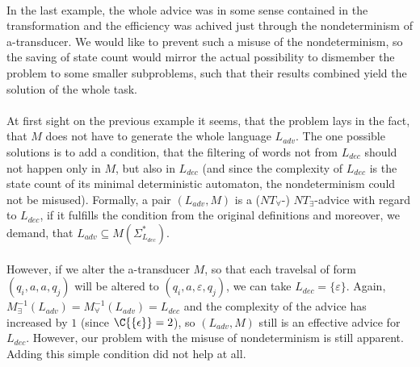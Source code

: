 \paragraph{}
In the last example, the whole advice was in some sense contained in the transformation and the efficiency was achived just through the nondeterminism of a-transducer. We would like to prevent such a misuse of the nondeterminism, so the saving of state count would mirror the actual possibility to dismember the problem to some smaller subproblems, such that their results combined yield the solution of the whole task.

\paragraph{}
At first sight on the previous example it seems, that the problem lays in the fact, that $M$ does not have to generate the whole language $L_{adv}$. The one possible solutions is to add a condition, that the filtering of words not from $L_{dec}$ should not happen only in $M$, but also in $L_{dec}$ (and since the complexity of $L_{dec}$ is the state count of its minimal deterministic automaton, the nondeterminism could not be misused). Formally, a pair $(L_{adv}, M)$ is a ($NT_{\forall}$-) $NT_{\exists}$-advice with regard  to $L_{dec}$, if it fulfills the condition from the original definitions and moreover, we demand, that $L_{adv} \subseteq M(\Sigma_{L_{dec}}^*)$.

\paragraph{}
However, if we alter the a-transducer $M$, so that each travelsal of form $(q_i,a,a,q_j)$ will be altered to $(q_i,a,\varepsilon,q_j)$, we can take $L_{dec} = \{\varepsilon\}$. Again, $M^{-1}_{\exists}(L_{adv}) = M^{-1}_{\forall}(L_{adv}) = L_{dec}$ and the complexity of the advice has increased by $1$ (since $\C{\{\epsilon\}} = 2$), so $(L_{adv},M)$ still is an effective advice for $L_{dec}$. However, our problem with the misuse of nondeterminism is still apparent. Adding this simple condition did not help at all.

